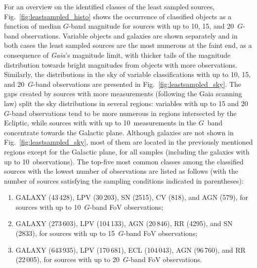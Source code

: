 \documentclass[longauth]{aa}
\def\gaia{\textit{Gaia}\xspace}
\def\g{$G$\xspace}
\begin{document}
For an overview on the identified classes of the least sampled sources, Fig.~\ref{fig:leastsampled_histo} shows the occurrence of classified objects as a function of median \g-band magnitude for sources with up to 10, 15, and 20~\g-band observations. Variable objects and galaxies are shown separately and in both cases the least sampled sources are the most numerous at the faint end, as a consequence of \gaia's magnitude limit, with thicker tails of the magnitude distribution towards bright magnitudes from objects with more observations.
Similarly, the distributions in the sky of variable classifications with up to 10, 15, and 20~\g-band observations are presented in Fig.~\ref{fig:leastsampled_sky}. The gaps created by sources with more measurements (following the Gaia scanning law) split the sky distributions in several regions: variables with up to 15 and 20~\g-band observations tend to be more numerous in regions intersected by the Ecliptic, while sources with with up to 10~measurements in the \g~band concentrate towards the Galactic plane. Although galaxies are not shown in Fig.~\ref{fig:leastsampled_sky}, most of them are located in the previously mentioned regions except for the Galactic plane, for all samples (including the galaxies with up to 10~observations).
The top-five most common classes among the classified sources with the lowest number of observations are listed as follows (with the number of sources satisfying the sampling conditions indicated in parentheses):
\begin{enumerate}
    \item GALAXY (43\,428), LPV (30\,203), SN (2515), CV (818), and AGN (579), for sources with up to 10~\g-band FoV observations;
    \item GALAXY (273\,603), LPV (104\,133), AGN (20\,846), RR (4295), and SN (2833), for sources with up to 15~\g-band FoV observations;
    \item GALAXY (643\,935), LPV (170\,681), ECL (104\,043), AGN (96\,760), and RR (22\,005), for sources with up to 20~\g-band FoV observations.
\end{enumerate}
\end{document}
